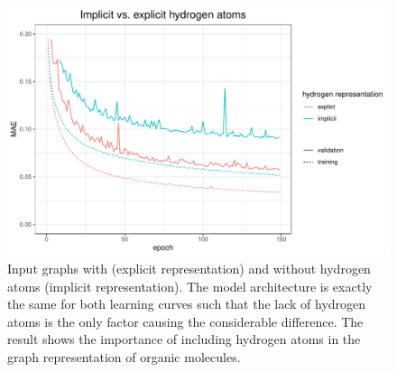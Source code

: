\begin{figure}[H]
	\includegraphics[width=\linewidth]{figures/implict-hydrogens.pdf}
	\caption{Input graphs with (explicit representation) and without hydrogen atoms (implicit representation). The model architecture is exactly the same for both learning curves such that the lack of hydrogen atoms is the only factor causing the considerable difference. The result shows the importance of including hydrogen atoms in the graph representation of organic molecules.}
	\label{fig:implicit-hydrogens}
\end{figure}

